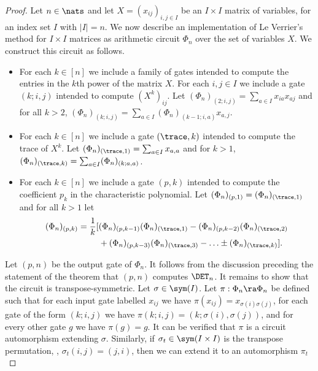 \documentclass{toc}
\begin{document}
\begin{proof}
  Let $n \in \nats$ and let $X = (x_{ij})_{i, j \in I}$ be an $I \times I$
  matrix of variables, for an index set $I$ with $\vert I \vert=n$. We now
  describe an implementation of Le Verrier's method for $I \times I$ matrices as
  arithmetic circuit $\Phi_n$ over the set of variables $X$. We construct this
  circuit as follows.
  \begin{itemize}
  \item For each $k \in [n]$ we include a family of gates intended to compute
    the entries in the $k$th power of the matrix $X$. For each $i, j \in I$ we
    include a gate $(k; i, j)$ intended to compute $(X^k)_{ij}$. Let
    $(\Phi_n)_{(2; i ,j)} = \sum_{a \in I} x_{ia} x_{aj}$ and for all $k > 2$,
    $(\Phi_n)_{(k; i ,j)} = \sum_{a \in I} (\Phi_n)_{(k-1; i, a)} x_{a, j}$.
  \item For each $k \in [n]$ we include a gate $(\trace, k)$ intended to compute
    the trace of $X^k$. Let $(\Phi_n)_{(\trace, 1)} = \sum_{a \in I} x_{a, a}$
    and for $k > 1$, $(\Phi_n)_{(\trace, k)} = \sum_{a \in I} (\Phi_n)_{(k; a,
      a)}$.
  \item For each $k \in [n]$ we include a gate $(p, k)$ intended to compute the
    coefficient $p_k$ in the characteristic polynomial. Let $(\Phi_n)_{(p, 1)} =
    (\Phi_n)_{(\trace, 1)}$ and for all $k > 1$ let
    \begin{align*}
      (\Phi_n)_{(p, k)} = \frac{1}{k}[&(\Phi_n)_{(p, k - 1)} (\Phi_n)_{(\trace, 1)} - (\Phi_n)_{(p, k - 2)} (\Phi_n)_{(\trace, 2)} \\ &+ (\Phi_n)_{(p, k - 3)} (\Phi_n)_{(\trace, 3)} - \ldots \pm (\Phi_n)_{(\trace, k)}].
    \end{align*}
  \end{itemize}
  Let $(p, n)$ be the output gate of $\Phi_n$. It follows from the discussion
  preceding the statement of the theorem that $(p, n)$ computes $\DET_n$.
  It remains to show that the circuit is transpose-symmetric. Let $\sigma \in
  \sym(I)$. Let $\pi : \Phi_n \ra \Phi_n$ be defined such that for each input
  gate labelled $x_{ij}$ we have $\pi (x_{ij}) = x_{\sigma(i)\sigma(j)}$, for
  each gate of the form $(k; i, j)$ we have $\pi (k; i, j) = (k;
  \sigma(i),\sigma(j))$, and for every other gate $g$ we have $\pi (g) = g$. It
  can be verified that $\pi$ is a circuit automorphism extending $\sigma$.
  Similarly, if $\sigma_t \in \sym(I \times I)$ is the transpose permutation,
  \ie, $\sigma_t(i,j) = (j,i)$, then we can extend it to an automorphism $\pi_t$

\end{proof}
\end{document}
